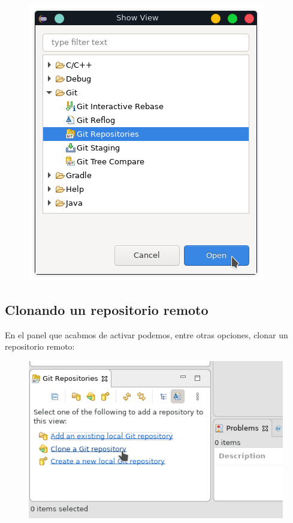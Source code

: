 \documentclass{article}
\begin{document}
\begin{figure}[h!]
  \centering
  \includegraphics[scale=0.75]{./Pictures/011_show_view_git_repository.png}
\end{figure}

\newpage

\subsection*{Clonando un repositorio remoto}%
En el panel que acabmos de activar podemos, entre otras opciones, clonar un
repositorio remoto:

\begin{figure}[h!]
  \centering
  \includegraphics[scale=0.75]{./Pictures/012_clone_repository.png}
\end{figure}
\end{document}

